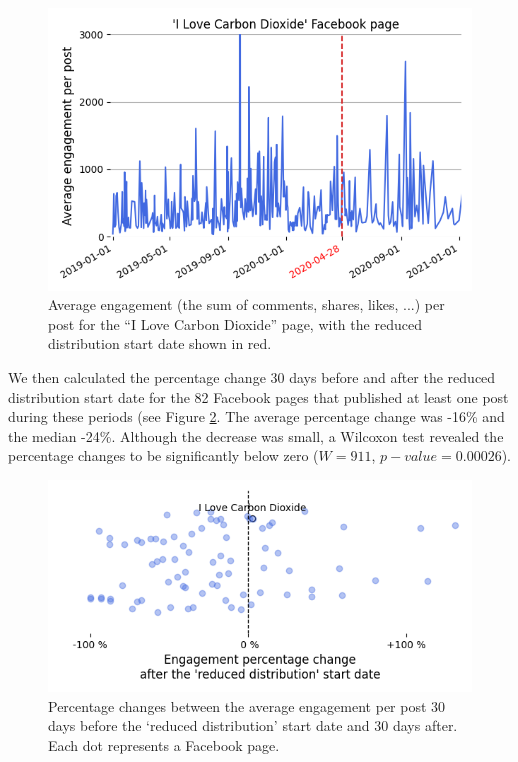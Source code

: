 \documentclass[11pt,a4paper]{article}
\begin{document}
\begin{figure}[!h]
\centering
\includegraphics[width=\linewidth]{./../figure/reduce_example_timeseries.png}
\caption{Average engagement (the sum of comments, shares, likes, ...) per post for the “I Love Carbon Dioxide” page, with the reduced distribution start date shown in red.}
\label{reduce_example_timeseries}
\end{figure}

We then calculated the percentage change 30 days before and after the reduced distribution start date for the 82 Facebook pages that published at least one post during these periods (see Figure \ref{reduce_percentage_change}. 
The average percentage change was -16\% and the median -24\%. 
Although the decrease was small, a Wilcoxon test revealed the percentage changes to be significantly below zero ($W = 911$, $p-value = 0.00026$).

\begin{figure}[!h]
\centering
\includegraphics[width=\linewidth]{./../figure/reduce_percentage_change.png}
\caption{Percentage changes between the average engagement per post 30 days before the `reduced distribution' start date and 30 days after. Each dot represents a Facebook page.}
\label{reduce_percentage_change}
\end{figure}
\end{document}
